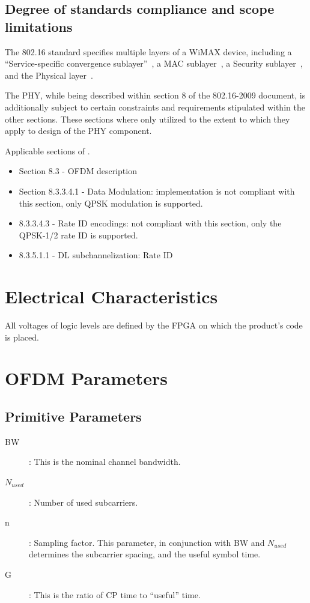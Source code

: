 \documentclass[dvips,10pt,twocolumn]{article}
\begin{document}
	\subsection{Degree of standards compliance and scope limitations}
	\label{sec:comply}
	The 802.16 standard specifies multiple layers of a WiMAX device,
	including a ``Service-specific convergence
	sublayer''~\cite[section 5]{IEEE:802.16}, a MAC
	sublayer~\cite[section 6]{IEEE:802.16}, a Security
	sublayer~\cite[section 7]{IEEE:802.16}, and the Physical
	layer~\cite[section 8]{IEEE:802.16}. 
	
	The PHY, while being described within section 8 of the 802.16-2009
	document, is additionally subject to certain constraints and
	requirements stipulated within the other sections.  These sections
	where only utilized to the extent to which they apply to design of
	the PHY component.

	Applicable sections of \cite{IEEE:802.16}.
	\begin{itemize}
		\item Section 8.3 - OFDM description
		\item Section 8.3.3.4.1 - Data Modulation: implementation
			is not compliant with this section, only QPSK
			modulation is supported.
		\item 8.3.3.4.3 - Rate ID encodings: not compliant with
			this section, only the QPSK-1/2 rate ID is supported.
		\item 8.3.5.1.1 - DL subchannelization: Rate ID
	\end{itemize}

\section{Electrical Characteristics}
All voltages of logic levels are defined by the FPGA on which the product's
code is placed.


\section{OFDM Parameters}

\subsection{Primitive Parameters}

\begin{description}
	\item[BW]: This is the nominal channel bandwidth.
	\item[$N_{used}$]: Number of used subcarriers.
	\item[n]: Sampling factor. This parameter, in conjunction with BW
		and $N_{used}$ determines the subcarrier spacing, and the
		useful symbol time.
	\item[G]: This is the ratio of CP time to ``useful'' time.
\end{description}
\end{document}
